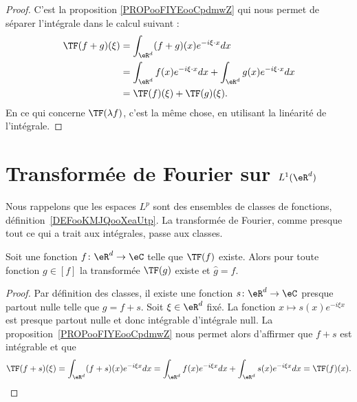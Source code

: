 \begin{proof}
    C'est la proposition \ref{PROPooFIYEooCpdmwZ} qui nous permet de séparer l'intégrale dans le calcul suivant :
    \begin{subequations}
        \begin{align}
            \TF(f+g)(\xi)&=\int_{\eR^d}(f+g)(x) e^{-i\xi\cdot x}dx\\
            &=\int_{\eR^d}f(x) e^{-i\xi\cdot x}dx+\int_{\eR^d}g(x) e^{-i\xi\cdot x}dx\\
            &=\TF(f)(\xi)+\TF(g)(\xi).
        \end{align}
    \end{subequations}
    En ce qui concerne \( \TF(\lambda f)\), c'est la même chose, en utilisant la linéarité de l'intégrale.
\end{proof}

\section{Transformée de Fourier sur \( L^1(\eR^d)\)}

Nous rappelons que les espaces \( L^p\) sont des ensembles de classes de fonctions, définition~\ref{DEFooKMJQooXeaUtp}. La transformée de Fourier, comme presque tout ce qui a trait aux intégrales, passe aux classes.

\begin{lemma}
    Soit une fonction \( f\colon \eR^d\to \eC\) telle que \( \TF(f)\) existe. Alors pour toute fonction \( g\in[f]\) la transformée \( \TF(g)\) existe et \( \hat g=\hat f\).
\end{lemma}

\begin{proof}
    Par définition des classes, il existe une fonction \( s\colon \eR^d\to \eC\) presque partout nulle telle que \( g=f+s\). Soit \( \xi\in \eR^d\) fixé. La fonction \( x\mapsto s(x) e^{-i\xi x}\) est presque partout nulle et donc intégrable d'intégrale null. La proposition~\ref{PROPooFIYEooCpdmwZ} nous permet alors d'affirmer que \( f+s\) est intégrable et que
    \begin{equation}
        \TF(f+s)(\xi)=\int_{\eR^d}(f+s)(x) e^{-i\xi x}dx=\int_{\eR^d}f(x) e^{-i\xi x}dx+\int_{\eR^d}s(x) e^{-i\xi x}dx=\TF(f)(x).
    \end{equation}
\end{proof}

